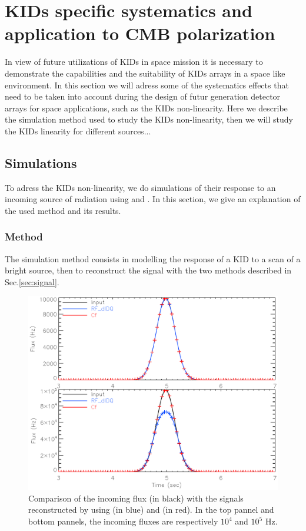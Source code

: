 
\section{KIDs specific systematics and application to CMB polarization}

In view of future utilizations of KIDs in space mission it is necessary to demonstrate the capabilities and the suitability of KIDs arrays in a space like environment. In this section we will adress some of the systematics effects that need to be taken into account during the design of futur generation detector arrays for space applications, such as the KIDs non-linearity. Here we describe the simulation method used to study the KIDs non-linearity, then we will study the KIDs linearity for different sources... \\

\subsection{Simulations}
To adress the KIDs non-linearity, we do simulations of their response to an incoming source of radiation using \rf and \cf. In this section, we give an explanation of the used method and its results.

	\subsubsection{Method}
	
The simulation method consists in modelling the response of a KID to a scan of a bright source, then to reconstruct the signal with the two methods described in Sec.\ref{sec:signal}.

\begin{figure}[h]
\center
\includegraphics[scale=0.55]{Figures/planets.eps}
\caption{Comparison of the incoming flux (in black) with the signals reconstructed by using \rf (in blue) and \cf (in red). In the top pannel and bottom pannels, the incoming fluxes are respectively $10^{4}$ and $10^{5}$ Hz.}
\label{fig:planets}
\end{figure}

